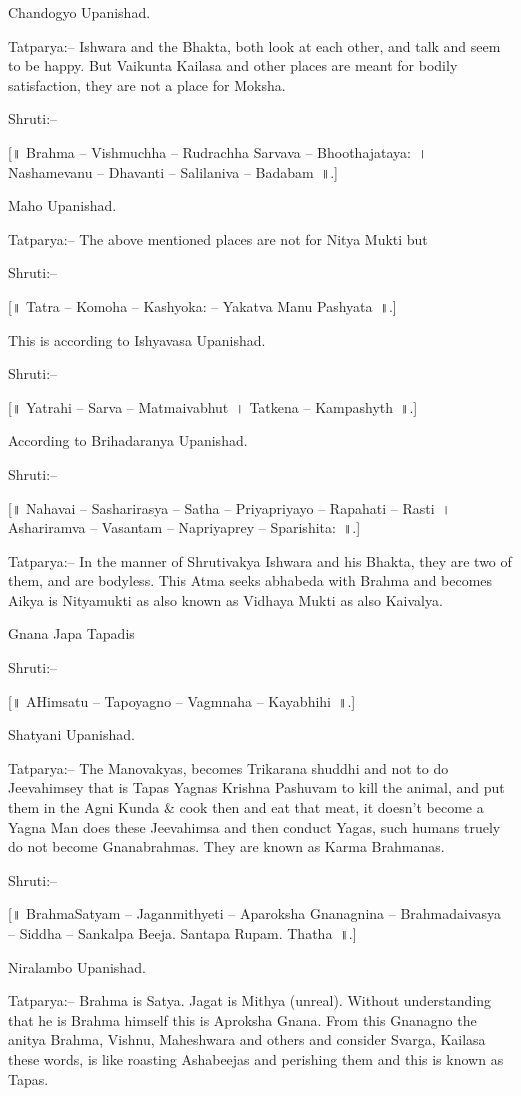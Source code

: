 Chandogyo Upanishad.

Tatparya:– Ishwara and the Bhakta, both look at each other, and talk and seem to be happy. But Vaikunta Kailasa and other places are meant for bodily satisfaction, they are not a place for Moksha.

Shruti:–

[॥ Brahma – Vishmuchha – Rudrachha Sarvava – Bhoothajataya:~। Nashamevanu – Dhavanti – Salilaniva – Badabam~॥.]

Maho Upanishad.

Tatparya:– The above mentioned places are not for Nitya Mukti but

Shruti:–

[॥ Tatra – Komoha – Kashyoka: – Yakatva Manu Pashyata~॥.]

This is according to Ishyavasa Upanishad.

Shruti:–

[॥ Yatrahi – Sarva – Matmaivabhut~। Tatkena – Kampashyth~॥.]

According to Brihadaranya Upanishad.

Shruti:–

[॥ Nahavai – Sasharirasya – Satha – Priyapriyayo – Rapahati – Rasti~। Ashariramva – Vasantam – Napriyaprey – Sparishita:~॥.]

Tatparya:– In the manner of Shrutivakya Ishwara and his Bhakta, they are two of them, and are bodyless. This Atma seeks abhabeda with Brahma and becomes Aikya is Nityamukti as also known as Vidhaya Mukti as also Kaivalya.

Gnana Japa Tapadis

Shruti:–

[॥ AHimsatu – Tapoyagno – Vagmnaha – Kayabhihi~॥.]

Shatyani Upanishad.

Tatparya:– The Manovakyas, becomes Trikarana shuddhi and not to do Jeevahimsey that is Tapas Yagnas Krishna Pashuvam to kill the animal, and put them in the Agni Kunda \& cook then and eat that meat, it doesn't become a Yagna Man does these Jeevahimsa and then conduct Yagas, such humans truely do not become Gnanabrahmas. They are known as Karma Brahmanas.

Shruti:–

[॥ BrahmaSatyam – Jaganmithyeti – Aparoksha Gnanagnina – Brahmadaivasya – Siddha – Sankalpa Beeja. Santapa Rupam. Thatha~॥.]

Niralambo Upanishad.

Tatparya:– Brahma is Satya. Jagat is Mithya (unreal). Without understanding that he is Brahma himself this is Aproksha Gnana. From this Gnanagno the anitya Brahma, Vishnu, Maheshwara and others and consider Svarga, Kailasa these words, is like roasting Ashabeejas and perishing them and this is known as Tapas.

